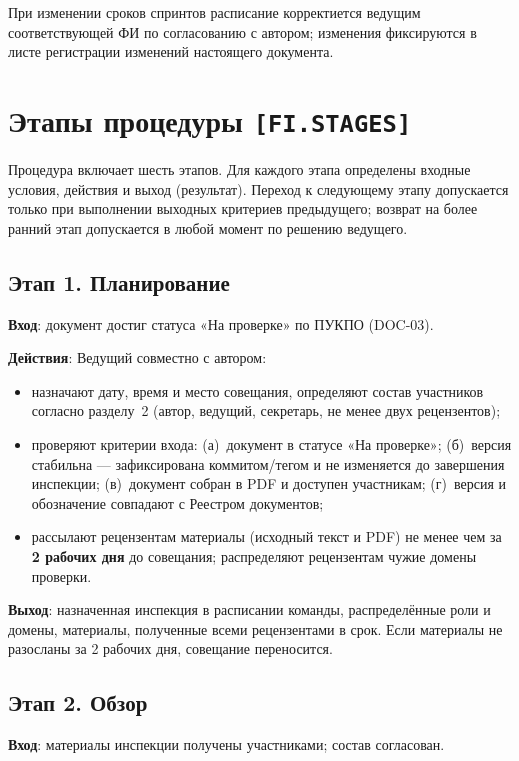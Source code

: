 \documentclass[12pt,a4paper]{article}
\newcommand{\reqfield}[1]{\textbf{#1}:} %
\begin{document}
При изменении сроков спринтов расписание корректиется ведущим соответствующей
ФИ по согласованию с автором; изменения фиксируются в листе регистрации
изменений настоящего документа.

\section{Этапы процедуры \texttt{[FI.STAGES]}}

Процедура включает шесть этапов. Для каждого этапа определены входные условия,
действия и выход (результат). Переход к следующему этапу допускается только при
выполнении выходных критериев предыдущего; возврат на более ранний этап
допускается в любой момент по решению ведущего.

\subsection{Этап 1. Планирование}

\reqfield{Вход} документ достиг статуса «На проверке» по ПУКПО (DOC-03).

\reqfield{Действия} Ведущий совместно с автором:
\begin{itemize}
  \item назначают дату, время и место совещания, определяют состав участников
        согласно разделу~2 (автор, ведущий, секретарь, не менее двух
        рецензентов);
  \item проверяют критерии входа: (а)~документ в статусе «На проверке»;
        (б)~версия стабильна --- зафиксирована коммитом/тегом и не изменяется
        до завершения инспекции; (в)~документ собран в PDF и доступен
        участникам; (г)~версия и обозначение совпадают с Реестром документов;
  \item рассылают рецензентам материалы (исходный текст и PDF) не менее чем за
        \textbf{2 рабочих дня} до совещания; распределяют рецензентам чужие
        домены проверки.
\end{itemize}

\reqfield{Выход} назначенная инспекция в расписании команды, распределённые
роли и домены, материалы, полученные всеми рецензентами в срок. Если материалы
не разосланы за 2 рабочих дня, совещание переносится.

\subsection{Этап 2. Обзор}

\reqfield{Вход} материалы инспекции получены участниками; состав согласован.
\end{document}
